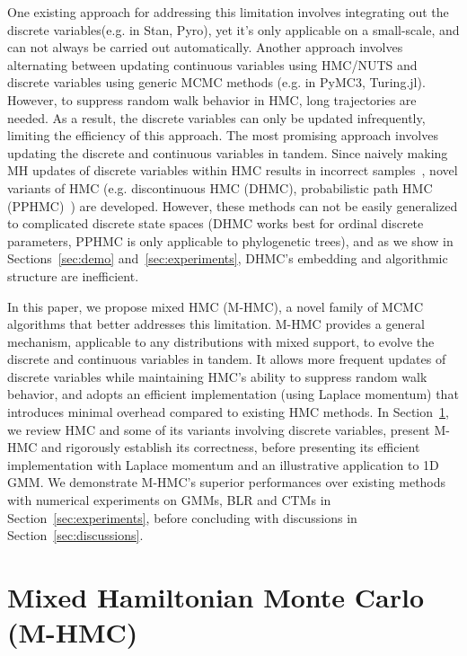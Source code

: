 \documentclass{article}
\begin{document}
One existing approach for addressing this limitation involves integrating out the discrete variables(e.g. in Stan\cite{Carpenter2017-zi}, Pyro\cite{bingham2018pyro}), yet it's only applicable on a small-scale, and can not always be carried out automatically. Another approach involves alternating between updating continuous variables using HMC/NUTS and discrete variables using generic MCMC methods (e.g. in PyMC3\cite{Salvatier2016}, Turing.jl\cite{ge2018t}). However, to suppress random walk behavior in HMC, long trajectories are needed. As a result, the discrete variables can only be updated infrequently, limiting the efficiency of this approach. The most promising approach involves updating the discrete and continuous variables in tandem. Since naively making MH updates of discrete variables within HMC results in incorrect samples~\cite{Neal2012-cp}, novel variants of HMC (e.g. discontinuous HMC (DHMC)\cite{Nishimura2017-wv, Zhou2019-uk}, probabilistic path HMC (PPHMC)~\cite{Dinh2017-td}) are developed. However, these methods can not be easily generalized to complicated discrete state spaces (DHMC works best for ordinal discrete parameters, PPHMC is only applicable to phylogenetic trees), and as we show in Sections~\ref{sec:demo} and~\ref{sec:experiments}, DHMC's embedding and algorithmic structure are inefficient.

In this paper, we propose mixed HMC (M-HMC), a novel family of MCMC algorithms that better addresses this limitation. M-HMC provides a general mechanism, applicable to any distributions with mixed support, to evolve the discrete and continuous variables in tandem. It allows more frequent updates of discrete variables while maintaining HMC's ability to suppress random walk behavior, and adopts an efficient implementation (using Laplace momentum) that introduces minimal overhead compared to existing HMC methods. In Section~\ref{sec:theory}, we review HMC and some of its variants involving discrete variables, present M-HMC and rigorously establish its correctness, before presenting its efficient implementation with Laplace momentum and an illustrative application to 1D GMM. We demonstrate M-HMC's superior performances over existing methods with numerical experiments on GMMs, BLR and CTMs in Section~\ref{sec:experiments}, before concluding with discussions in Section~\ref{sec:discussions}.

\section{Mixed Hamiltonian Monte Carlo (M-HMC)}\label{sec:theory}
\end{document}
